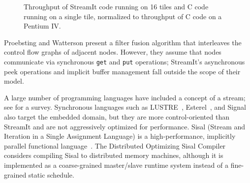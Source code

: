 \begin{figure}
\centering
{}
\vspace{-6pt}
\caption{Throughput of StreamIt code running on 16 tiles and C code
running on a single tile, normalized to throughput of C code on a
Pentium IV. \protect\label{fig:utilization-diagram}}
\vspace{-12pt}
\end{figure}

Proebsting and Watterson \cite{pro96} present a filter fusion
algorithm that interleaves the control flow graphs of adjacent nodes.
However, they assume that nodes communicate via synchronous {\tt get}
and {\tt put} operations; StreamIt's asynchronous peek operations and
implicit buffer management fall outside the scope of their model.

A large number of programming languages have included a concept of a
stream; see \cite{survey97} for a survey.  Synchronous languages such
as LUSTRE~\cite{lustre}, Esterel~\cite{esterel92}, and
Signal~\cite{signal} also target the embedded domain, but they are
more control-oriented than StreamIt and are not aggressively optimized
for performance.  Sisal (Stream and Iteration in a Single Assignment
Language) is a high-performance, implicitly parallel functional
language~\cite{sisal}.  The Distributed Optimizing Sisal
Compiler~\cite{sisal} considers compiling Sisal to distributed memory
machines, although it is implemented as a coarse-grained master/slave
runtime system instead of a fine-grained static schedule.

